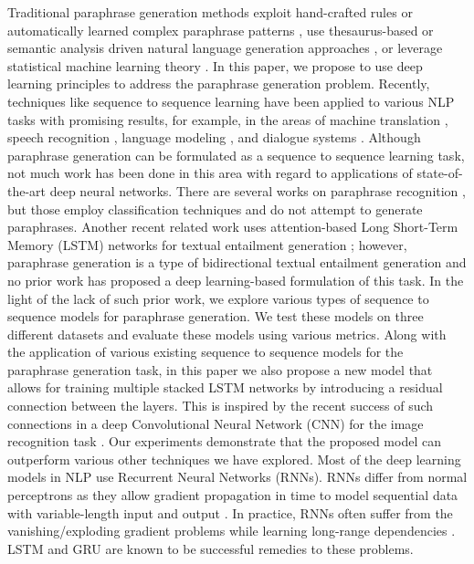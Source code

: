 Traditional paraphrase generation methods exploit hand-crafted rules \cite{McKeown1983} or automatically learned complex paraphrase patterns \cite{Zhao2009}, use thesaurus-based \cite{Hassan2007} or semantic analysis driven natural language generation approaches \cite{Kozlowski2003}, or leverage statistical machine learning theory \cite{quirk2004,Wubben2010}. In this paper, we propose to use deep learning principles to address the paraphrase generation problem.
Recently, techniques like sequence to sequence learning \cite{SutskeverVL14} have been applied to various NLP tasks with promising results, for example, in the areas of machine translation \cite{cho14,Bahdanau15}, speech recognition \cite{li2015constructing}, language modeling \cite{vinyals2015grammar}, and dialogue systems \cite{serban2016multiresolution}. Although paraphrase generation can be formulated as a sequence to sequence learning task, not much work has been done in this area with regard to applications of state-of-the-art deep neural networks. There are several works on paraphrase recognition \cite{SocherEtAl2011,yin-schutze2015,kiros2015skip}, but those employ classification techniques and do not attempt to generate paraphrases. Another recent related work uses attention-based Long Short-Term Memory (LSTM) networks for textual entailment generation \cite{KolesnykRR16}; however, paraphrase generation is a type of bidirectional textual entailment generation and no prior work has proposed a deep learning-based formulation of this task.
In the light of the lack of such prior work, we explore various types of sequence to sequence models for paraphrase generation. We test these models on three different datasets and evaluate these models using various metrics. Along with the application of various existing sequence to sequence models for the paraphrase generation task, in this paper we also propose a new model that allows for training multiple stacked LSTM networks by introducing a residual connection between the layers. This is inspired by the recent success of such connections in a deep Convolutional Neural Network (CNN) for the image recognition task \cite{he2015deep}. Our experiments demonstrate that the proposed model can outperform various other techniques we have explored.
Most of the deep learning models in NLP use Recurrent Neural Networks (RNNs). RNNs differ from normal perceptrons as they allow gradient propagation in time to model sequential data with variable-length input and output \cite{SutskeverMH11}. In practice, RNNs often suffer from the vanishing/exploding gradient problems while learning long-range dependencies \cite{Bengio94}. LSTM \cite{Hochreiter:1997} and GRU \cite{cho14} are known to be successful remedies to these problems.
